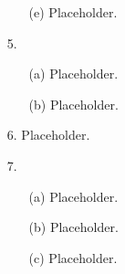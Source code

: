 \documentclass[11pt]{article}
\begin{document}
\begin{itemize}
\begin{itemize}
            \item[(e)]
                Placeholder.
        \end{itemize}

    \item[5.]
        \begin{itemize}
            \item[(a)]
                Placeholder.

            \item[(b)]
                Placeholder.
        \end{itemize}

    \item[6.]
        Placeholder.

    \item[7.]
        \begin{itemize}
            \item[(a)]
                Placeholder.

            \item[(b)]
                Placeholder.

            \item[(c)]
                Placeholder.
        \end{itemize}
\end{itemize}

\end{document}
